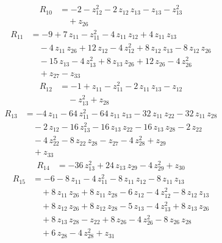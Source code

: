 \begin{equation*}\begin{aligned}
R_{10}&=-2 -z_{12}^{2} -2\,z_{12}\,z_{13} -z_{13} -z_{13}^{2} \\
&\quad +z_{26}
\end{aligned}\end{equation*}
\begin{equation*}\begin{aligned}
R_{11}&=-9 +7\,z_{11} -z_{11}^{2} -4\,z_{11}\,z_{12} +4\,z_{11}\,z_{13} \\
&\quad -4\,z_{11}\,z_{26} +12\,z_{12} -4\,z_{12}^{2} +8\,z_{12}\,z_{13} -8\,z_{12}\,z_{26} \\
&\quad -15\,z_{13} -4\,z_{13}^{2} +8\,z_{13}\,z_{26} +12\,z_{26} -4\,z_{26}^{2} \\
&\quad +z_{27} -z_{33}
\end{aligned}\end{equation*}
\begin{equation*}\begin{aligned}
R_{12}&=-1 +z_{11} -z_{11}^{2} -2\,z_{11}\,z_{13} -z_{12} \\
&\quad -z_{13}^{2} +z_{28}
\end{aligned}\end{equation*}
\begin{equation*}\begin{aligned}
R_{13}&=-4\,z_{11} -64\,z_{11}^{2} -64\,z_{11}\,z_{13} -32\,z_{11}\,z_{22} -32\,z_{11}\,z_{28} \\
&\quad -2\,z_{12} -16\,z_{13}^{2} -16\,z_{13}\,z_{22} -16\,z_{13}\,z_{28} -2\,z_{22} \\
&\quad -4\,z_{22}^{2} -8\,z_{22}\,z_{28} -z_{27} -4\,z_{28}^{2} +z_{29} \\
&\quad +z_{33}
\end{aligned}\end{equation*}
\begin{equation*}\begin{aligned}
R_{14}&=-36\,z_{13}^{2} +24\,z_{13}\,z_{29} -4\,z_{29}^{2} +z_{30}
\end{aligned}\end{equation*}
\begin{equation*}\begin{aligned}
R_{15}&=-6 -8\,z_{11} -4\,z_{11}^{2} -8\,z_{11}\,z_{12} -8\,z_{11}\,z_{13} \\
&\quad +8\,z_{11}\,z_{26} +8\,z_{11}\,z_{28} -6\,z_{12} -4\,z_{12}^{2} -8\,z_{12}\,z_{13} \\
&\quad +8\,z_{12}\,z_{26} +8\,z_{12}\,z_{28} -5\,z_{13} -4\,z_{13}^{2} +8\,z_{13}\,z_{26} \\
&\quad +8\,z_{13}\,z_{28} -z_{22} +8\,z_{26} -4\,z_{26}^{2} -8\,z_{26}\,z_{28} \\
&\quad +6\,z_{28} -4\,z_{28}^{2} +z_{31}
\end{aligned}\end{equation*}

